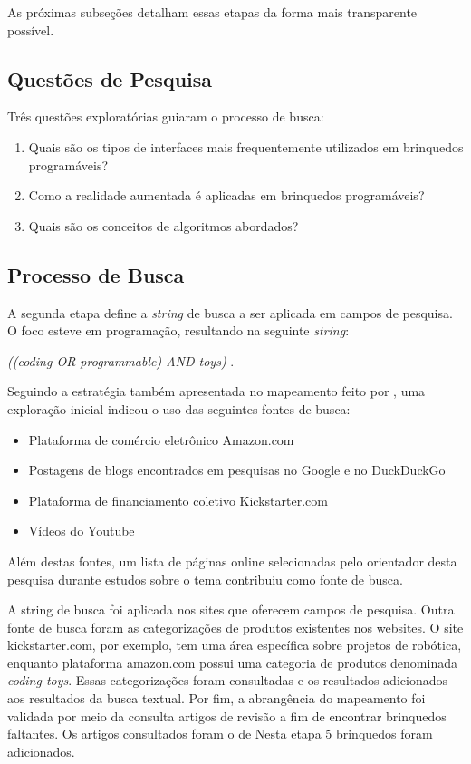 As próximas subseções detalham essas etapas da forma mais transparente possível.

\subsection{Questões de Pesquisa}

Três questões exploratórias guiaram o processo de busca:

\begin{enumerate}
    \item Quais são os tipos de interfaces mais frequentemente utilizados em brinquedos programáveis?
    \item Como a realidade aumentada é aplicadas em brinquedos programáveis?
    \item Quais são os conceitos de algoritmos abordados? 
\end{enumerate}

\subsection{Processo de Busca}
A segunda etapa define a \textit{string} de busca a ser aplicada em campos de pesquisa. O foco esteve em programação, resultando na seguinte \textit{string}:

\textit{ ((coding OR programmable) AND toys) }.

Seguindo a estratégia também apresentada no mapeamento feito por , uma exploração inicial indicou o uso das seguintes fontes de busca:

\begin{itemize}
    \item Plataforma de comércio eletrônico Amazon.com
    \item Postagens de blogs encontrados em pesquisas no Google e no DuckDuckGo
    \item Plataforma de financiamento coletivo Kickstarter.com
    \item Vídeos do Youtube
\end{itemize}

Além destas fontes, um lista de páginas online selecionadas pelo orientador desta pesquisa durante estudos sobre o tema contribuiu como fonte de busca.

A string de busca foi aplicada nos sites que oferecem campos de pesquisa. Outra fonte de busca foram as categorizações de produtos existentes nos websites. O site kickstarter.com, por exemplo, tem uma área específica sobre projetos de robótica, enquanto plataforma amazon.com possui uma categoria de produtos denominada \textit{coding toys}. Essas categorizações foram consultadas e os resultados adicionados aos resultados da busca textual. Por fim, a abrangência do mapeamento foi validada por meio da consulta artigos de revisão a fim de encontrar brinquedos faltantes. Os artigos consultados foram o de \cite{} Nesta etapa 5 brinquedos foram adicionados.

